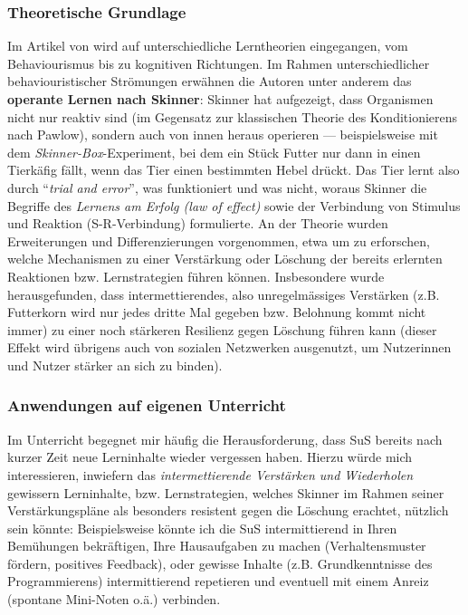\begin{myExBox}[title=Intermettierendes Verstärken von gewünschtem Lern-Verhalten]
\subsubsection*{Theoretische Grundlage}
Im Artikel von \textcite{alma99117228235505511} wird auf unterschiedliche Lerntheorien eingegangen, vom Behaviourismus bis zu kognitiven Richtungen. Im Rahmen unterschiedlicher behaviouristischer Strömungen erwähnen die Autoren unter anderem 
das \textbf{operante Lernen nach Skinner}: Skinner hat aufgezeigt, dass Organismen nicht nur reaktiv sind (im Gegensatz zur klassischen Theorie des Konditionierens nach Pawlow), sondern auch von innen heraus operieren --- beispielsweise mit dem \textit{Skinner-Box}-Experiment, bei dem ein Stück Futter nur dann in einen Tierkäfig fällt, wenn das Tier einen bestimmten Hebel drückt. Das Tier lernt also durch \enquote{\textit{trial and error}}, was funktioniert und was nicht, woraus Skinner die Begriffe des \textit{Lernens am Erfolg (law of effect)} sowie der Verbindung von Stimulus und Reaktion (S-R-Verbindung) formulierte.
An der Theorie wurden Erweiterungen und Differenzierungen vorgenommen, etwa um zu erforschen, welche Mechanismen zu einer Verstärkung oder Löschung der bereits erlernten Reaktionen bzw. Lernstrategien führen können. Insbesondere wurde herausgefunden, dass intermettierendes, also unregelmässiges Verstärken (z.B. Futterkorn wird nur jedes dritte Mal gegeben bzw. Belohnung kommt nicht immer) zu einer noch stärkeren Resilienz gegen Löschung führen kann (dieser Effekt wird übrigens auch von sozialen Netzwerken ausgenutzt, um Nutzerinnen und Nutzer stärker an sich zu binden).

\subsubsection*{Anwendungen auf eigenen Unterricht}
Im Unterricht begegnet mir häufig die Herausforderung, dass SuS bereits nach kurzer Zeit neue Lerninhalte wieder vergessen haben. Hierzu würde mich interessieren, inwiefern das \textit{intermettierende Verstärken und Wiederholen} gewissern Lerninhalte, bzw. Lernstrategien, welches Skinner im Rahmen seiner Verstärkungspläne als besonders resistent gegen die Löschung erachtet, nützlich sein könnte: Beispielsweise könnte ich die SuS intermittierend in Ihren Bemühungen bekräftigen, Ihre Hausaufgaben zu machen (Verhaltensmuster fördern, positives Feedback), oder gewisse Inhalte (z.B. Grundkenntnisse des Programmierens) intermittierend repetieren und eventuell mit einem Anreiz (spontane Mini-Noten o.ä.) verbinden.
\end{myExBox}

